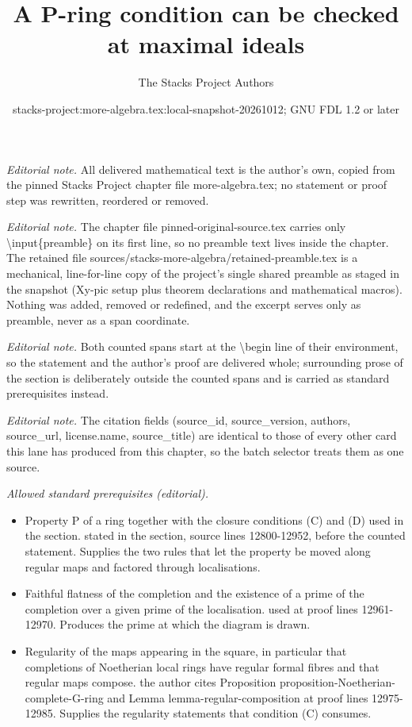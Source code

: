 \documentclass[10pt,a4paper]{amsart}
\title{A P-ring condition can be checked at maximal ideals}
\author{The Stacks Project Authors}
\date{stacks-project:more-algebra.tex:local-snapshot-20261012; GNU FDL 1.2 or later}
\theoremstyle{plain}
\theoremstyle{definition}
\theoremstyle{remark}
\numberwithin{equation}{subsection}
\begin{document}
\maketitle
\setcounter{subsection}{1}
\noindent\textit{Editorial note.} All delivered mathematical text is the author's own, copied from the pinned Stacks Project chapter file more-algebra.tex; no statement or proof step was rewritten, reordered or removed.\par\medskip
\noindent\textit{Editorial note.} The chapter file pinned-original-source.tex carries only \textbackslash{}input\{preamble\} on its first line, so no preamble text lives inside the chapter. The retained file sources/stacks-more-algebra/retained-preamble.tex is a mechanical, line-for-line copy of the project's single shared preamble as staged in the snapshot (Xy-pic setup plus theorem declarations and mathematical macros). Nothing was added, removed or redefined, and the excerpt serves only as preamble, never as a span coordinate.\par\medskip
\noindent\textit{Editorial note.} Both counted spans start at the \textbackslash{}begin line of their environment, so the statement and the author's proof are delivered whole; surrounding prose of the section is deliberately outside the counted spans and is carried as standard prerequisites instead.\par\medskip
\noindent\textit{Editorial note.} The citation fields (source\_id, source\_version, authors, source\_url, license.name, source\_title) are identical to those of every other card this lane has produced from this chapter, so the batch selector treats them as one source.\par\medskip
\noindent\textit{Allowed standard prerequisites (editorial).}\begin{itemize}
\item Property P of a ring together with the closure conditions (C) and (D) used in the section. stated in the section, source lines 12800-12952, before the counted statement. Supplies the two rules that let the property be moved along regular maps and factored through localisations.
\item Faithful flatness of the completion and the existence of a prime of the completion over a given prime of the localisation. used at proof lines 12961-12970. Produces the prime at which the diagram is drawn.
\item Regularity of the maps appearing in the square, in particular that completions of Noetherian local rings have regular formal fibres and that regular maps compose. the author cites Proposition proposition-Noetherian-complete-G-ring and Lemma lemma-regular-composition at proof lines 12975-12985. Supplies the regularity statements that condition (C) consumes.
\end{itemize}\medskip
\end{document}
